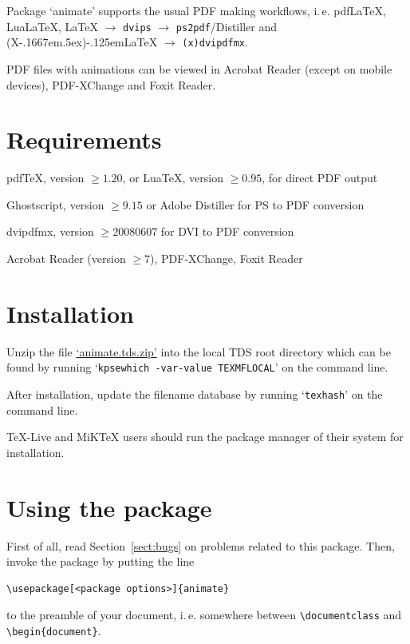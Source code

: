 \documentclass[a4paper]{article}
\def\pXepLaTeX{(X\kern-.1667em\lower.5ex\hbox{\reflectbox{E}})\kern-.125em\LaTeX}
\begin{document}
Package `animate' supports the usual PDF making workflows, i.\,e. pdf\LaTeX{}, Lua\LaTeX{}, \LaTeX{} $\rightarrow$ \verb+dvips+ $\rightarrow$ \verb+ps2pdf+/Distiller and \pXepLaTeX{} $\rightarrow$ \verb+(x)dvipdfmx+.

PDF files with animations can be viewed in Acrobat Reader (except on mobile devices), PDF-XChange and Foxit Reader.

\section{Requirements}
\begin{trivlist}
\item pdf\TeX{}, version $\ge1.20$, or Lua\TeX{}, version $\ge0.95$, for direct PDF output
\item Ghostscript, version $\ge9.15$ or Adobe Distiller for PS to PDF conversion
\item dvipdfmx, version $\ge20080607$ for DVI to PDF conversion
\item Acrobat Reader (version $\ge7$), PDF-XChange, Foxit Reader
\end{trivlist}

\section{Installation}
Unzip the file \href{http://mirrors.ctan.org/install/macros/latex/contrib/animate.tds.zip}{`animate.tds.zip'} into the local TDS root directory which can be found by running `\verb+kpsewhich -var-value TEXMFLOCAL+' on the command line.

After installation, update the filename database by running `\verb+texhash+' on the command line.

\TeX-Live and MiK\TeX{} users should run the package manager of their system for installation.

\section{Using the package}
First of all, read Section~\ref{sect:bugs} on problems related to this package. Then, invoke the package by putting the line
\begin{verbatim}
\usepackage[<package options>]{animate}
\end{verbatim}
to the preamble of your document, i.\,e. somewhere between \verb+\documentclass+ and \verb+\begin{document}+.
\end{document}
